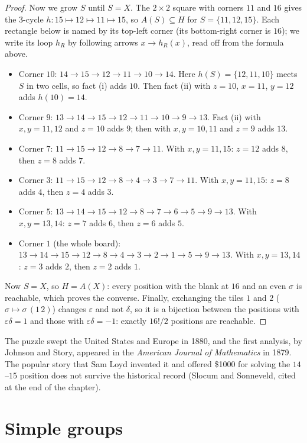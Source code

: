 \begin{proof}
Now we grow $S$ until $S=X$. The $2\times2$ square with corners $11$ and $16$ gives the $3$-cycle $h:15\mapsto12\mapsto11\mapsto15$, so $A(S)\subseteq H$ for $S=\{11,12,15\}$. Each rectangle below is named by its top-left corner (its bottom-right corner is $16$); we write its loop $h_R$ by following arrows $x\to h_R(x)$, read off from the formula above.
\begin{itemize}
\item Corner $10$: $14\to15\to12\to11\to10\to14$. Here $h(S)=\{12,11,10\}$ meets $S$ in two cells, so fact (i) adds $10$. Then fact (ii) with $z=10$, $x=11$, $y=12$ adds $h(10)=14$.
\item Corner $9$: $13\to14\to15\to12\to11\to10\to9\to13$. Fact (ii) with $x,y=11,12$ and $z=10$ adds $9$; then with $x,y=10,11$ and $z=9$ adds $13$.
\item Corner $7$: $11\to15\to12\to8\to7\to11$. With $x,y=11,15$: $z=12$ adds $8$, then $z=8$ adds $7$.
\item Corner $3$: $11\to15\to12\to8\to4\to3\to7\to11$. With $x,y=11,15$: $z=8$ adds $4$, then $z=4$ adds $3$.
\item Corner $5$: $13\to14\to15\to12\to8\to7\to6\to5\to9\to13$. With $x,y=13,14$: $z=7$ adds $6$, then $z=6$ adds $5$.
\item Corner $1$ (the whole board): $13\to14\to15\to12\to8\to4\to3\to2\to1\to5\to9\to13$. With $x,y=13,14$: $z=3$ adds $2$, then $z=2$ adds $1$.
\end{itemize}
Now $S=X$, so $H=A(X)$: every position with the blank at $16$ and an even $\sigma$ is reachable, which proves the converse. Finally, exchanging the tiles $1$ and $2$ ($\sigma\mapsto\sigma\,(1\,2)$) changes $\varepsilon$ and not $\delta$, so it is a bijection between the positions with $\varepsilon\delta=1$ and those with $\varepsilon\delta=-1$: exactly $16!/2$ positions are reachable.
\end{proof}

\begin{remark}
The puzzle swept the United States and Europe in 1880, and the first analysis, by Johnson and Story, appeared in the \emph{American Journal of Mathematics} in 1879. The popular story that Sam Loyd invented it and offered \$1000 for solving the $14$--$15$ position does not survive the historical record (Slocum and Sonneveld, cited at the end of the chapter).
\end{remark}

\section{Simple groups}

